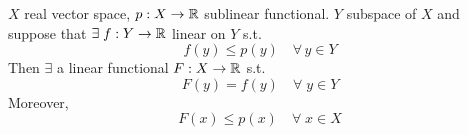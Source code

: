 \begin{theorem}
    \(X\) real vector space, \(p: X \to \mathbb{R}\) sublinear functional. 
    \(Y\) subspace of \(X\) and suppose that \(\exists \; f: Y \to \mathbb{R} \) linear on \(Y\) s.t. 
    \[
        f(y) \leq p(y) \quad \forall \, y \in Y
    \]
    Then \(\exists\) a linear functional \(F: X \to \mathbb{R} \) s.t. 
    \[
        F(y) = f(y) \quad \forall \; y \in Y \tag*{\(F\) is an extension of \(f\)}
    \]
    Moreover,
    \[
        F(x) \leq p(x) \quad \forall \; x \in X
    \] 
\end{theorem}
